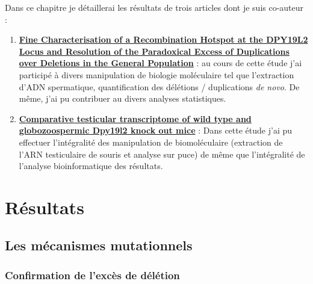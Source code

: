 \documentclass[12pt,twoside]{reedthesis}
\providecommand{\tightlist}{%
  \setlength{\itemsep}{0pt}\setlength{\parskip}{0pt}}
\theoremstyle{definition}
\theoremstyle{definition}
\theoremstyle{remark}
\begin{document}
  Dans ce chapitre je détaillerai les résultats de trois articles dont je
  suis co-auteur :
  
  \begin{enumerate}
  \def\labelenumi{\arabic{enumi}.}
  \tightlist
  \item
    \protect\hyperlink{mecamut}{\textbf{Fine Characterisation of a
    Recombination Hotspot at the DPY19L2 Locus and Resolution of the
    Paradoxical Excess of Duplications over Deletions in the General
    Population}} : au cours de cette étude j'ai participé à divers
    manipulation de biologie moléculaire tel que l'extraction d'ADN
    spermatique, quantification des délétions / duplications \emph{de
    novo}. De même, j'ai pu contribuer au divers analyses statistiques.\\
  \item
    \protect\hyperlink{transcriptome}{\textbf{Comparative testicular
    transcriptome of wild type and globozoospermic Dpy19l2 knock out
    mice}} : Dans cette étude j'ai pu effectuer l'intégralité des
    manipulation de biomoléculaire (extraction de l'ARN testiculaire de
    souris et analyse sur puce) de même que l'intégralité de l'analyse
    bioinformatique des résultats.
  \end{enumerate}
  
  \newpage
  
  \section{Résultats}\label{resultats}
  
  \hypertarget{mecamut}{\subsection{Les mécanismes
  mutationnels}\label{mecamut}}
  
  \subsubsection{Confirmation de l'excès de
  délétion}\label{confirmation-de-lexces-de-deletion}
  
\end{document}
